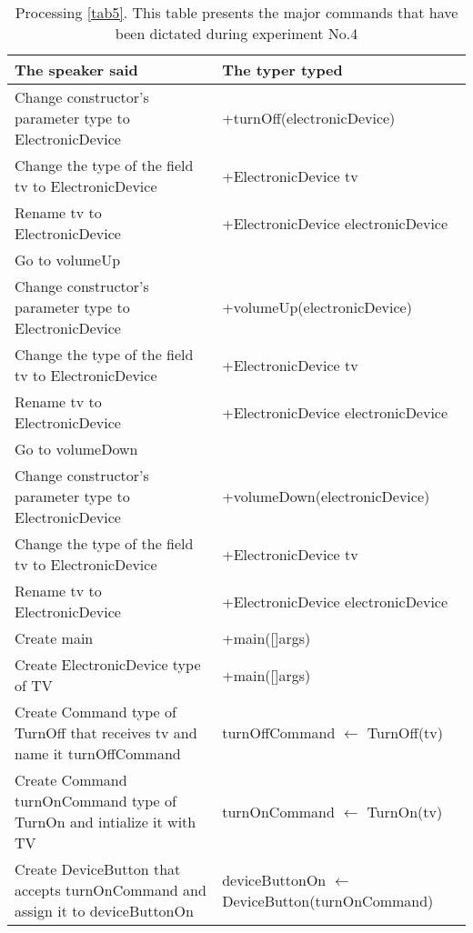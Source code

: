 \begin{table}[H]
	\begin{tabular}{|p{10cm}|p{6cm}|}
		\hline
		\rowcolor[HTML]{9B9B9B} 
		{\color[HTML]{000000} The speaker said} & {\color[HTML]{000000} The typer typed} \\ \hline
		Change constructor's parameter type to ElectronicDevice & +turnOff(electronicDevice) \\ \hline
		Change the type of the field tv to ElectronicDevice & +ElectronicDevice tv \\ \hline
		Rename tv to ElectronicDevice & +ElectronicDevice electronicDevice \\ \hline
		Go to volumeUp & \\ \hline
		Change constructor's parameter type to ElectronicDevice & +volumeUp(electronicDevice) \\ \hline
		Change the type of the field tv to ElectronicDevice & +ElectronicDevice tv \\ \hline
		Rename tv to ElectronicDevice & +ElectronicDevice electronicDevice \\ \hline
		Go to volumeDown & \\ \hline
		Change constructor's parameter type to ElectronicDevice & +volumeDown(electronicDevice) \\ \hline
		Change the type of the field tv to ElectronicDevice & +ElectronicDevice tv \\ \hline
		Rename tv to ElectronicDevice & +ElectronicDevice electronicDevice \\ \hline
		Create main & +main([]args) \\ \hline
		Create ElectronicDevice type of TV & +main([]args) \\ \hline
		Create Command type of TurnOff that receives tv and name it turnOffCommand & turnOffCommand $\leftarrow$ TurnOff(tv) \\ \hline
		Create Command turnOnCommand type of TurnOn and intialize it with TV & turnOnCommand $\leftarrow$ TurnOn(tv) \\ \hline
		Create DeviceButton that accepts turnOnCommand and assign it to deviceButtonOn & deviceButtonOn $\leftarrow$ DeviceButton(turnOnCommand)\\ \hline
	\end{tabular}
	\caption{Processing \autoref{tab5}. This table presents the major commands that have been dictated during experiment No.4}
	\label{tab6}
\end{table}
